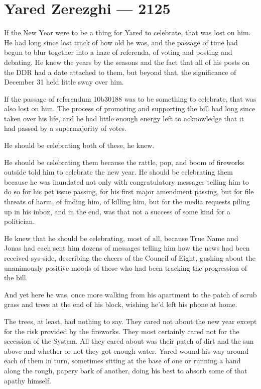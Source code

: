 \hypertarget{yared-zerezghi-2125}{%
\chapter{Yared Zerezghi — 2125}\label{yared-zerezghi-2125}}

If the New Year were to be a thing for Yared to celebrate, that was lost on him. He had long since lost track of how old he was, and the passage of time had begun to blur together into a haze of referenda, of voting and posting and debating. He knew the years by the seasons and the fact that all of his posts on the DDR had a date attached to them, but beyond that, the significance of December 31 held little sway over him.

If the passage of referendum 10b30188 was to be something to celebrate, that was also lost on him. The process of promoting and supporting the bill had long since taken over his life, and he had little enough energy left to acknowledge that it had passed by a supermajority of votes.

He should be celebrating both of these, he knew.

He should be celebrating them because the rattle, pop, and boom of fireworks outside told him to celebrate the new year. He should be celebrating them because he was inundated not only with congratulatory messages telling him to do so for his pet issue passing, for his first major amendment passing, but for file threats of harm, of finding him, of killing him, but for the media requests piling up in his inbox, and in the end, was that not a success of some kind for a politician.

He knew that he should be celebrating, most of all, because True Name and Jonas had each sent him dozens of messages telling him how the news had been received sys-side, describing the cheers of the Council of Eight, gushing about the unanimously positive moods of those who had been tracking the progression of the bill.

And yet here he was, once more walking from his apartment to the patch of scrub grass and trees at the end of his block, wishing he'd left his phone at home.

The trees, at least, had nothing to say. They cared not about the new year except for the risk provided by the fireworks. They most certainly cared not for the secession of the System. All they cared about was their patch of dirt and the sun above and whether or not they got enough water. Yared wound his way around each of them in turn, sometimes sitting at the base of one or running a hand along the rough, papery bark of another, doing his best to absorb some of that apathy himself.

